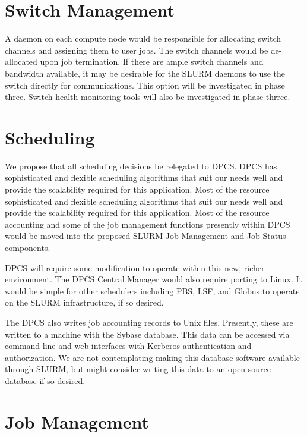 \section{Switch Management}

A daemon on each compute node would be responsible for allocating switch
channels and assigning them to user jobs. The switch channels would be
de-allocated upon job termination. If there are ample switch channels and
bandwidth available, it may be desirable for the SLURM daemons to use the
switch directly for communications. This option will be investigated in phase
three. Switch health monitoring tools will also be investigated in phase
thrree.

\section{Scheduling}

We propose that all scheduling decisions be relegated to DPCS. DPCS has
sophisticated and flexible scheduling algorithms that suit our needs well and
provide the scalability required for this application. Most of the resource
sophisticated and flexible scheduling algorithms that suit our needs well and
provide the scalability required for this application. Most of the resource
accounting and some of the job management functions presently within DPCS would
be moved into the proposed SLURM Job Management and Job Status components. 

DPCS will require some modification to operate within this new, richer
environment. The DPCS Central Manager would also require porting to Linux. It
would be simple for other schedulers including PBS, LSF, and Globus to operate
on the SLURM infrastructure, if so desired. 

The DPCS also writes job accounting records to Unix files. Presently, these are
written to a machine with the Sybase database. This data can be accessed via
command-line and web interfaces with Kerberos authentication and authorization.
We are not contemplating making this database software available through SLURM,
but might consider writing this data to an open source database if so desired.

\section{Job Management}

